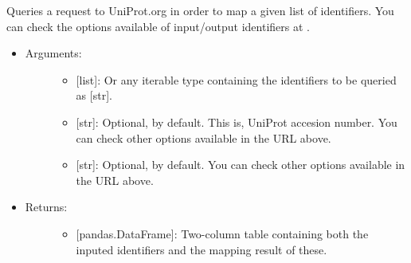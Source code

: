 \documentclass[letterpaper,10pt,english]{sphinxmanual}
\begin{document}
\begin{fulllineitems}
\begin{itemize}
\begin{description}
\end{description}

\end{itemize}

\end{fulllineitems}


\begin{fulllineitems}
\label{\detokenize{databases:data_tools.databases.up_map}}
Queries a request to UniProt.org in order to map a given list of
identifiers. You can check the options available of input/output
identifiers at .
\begin{itemize}
\item {} \begin{description}
\item[{Arguments:}] \leavevmode\begin{itemize}
\item {} 
 {[}list{]}: Or any iterable type containing the
identifiers to be queried as {[}str{]}.

\item {} 
 {[}str{]}: Optional,  by default. This is,
UniProt accesion number. You can check other options available
in the URL above.

\item {} 
 {[}str{]}: Optional,  by default. You can
check other options available in the URL above.

\end{itemize}

\end{description}

\item {} \begin{description}
\item[{Returns:}] \leavevmode\begin{itemize}
\item {} 
{[}pandas.DataFrame{]}: Two-column table containing both the
inputed identifiers and the mapping result of these.

\end{itemize}


\end{description}
\end{itemize}
\end{fulllineitems}
\end{document}
